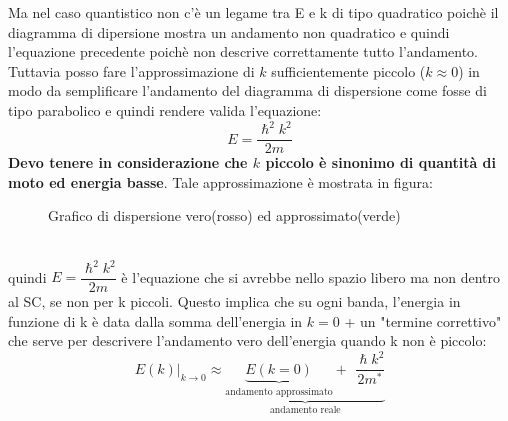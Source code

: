 Ma nel caso quantistico non c'è un legame tra E e k di tipo quadratico poichè il diagramma di dipersione mostra un andamento non quadratico e quindi l'equazione precedente poichè non descrive correttamente tutto l'andamento.\\
Tuttavia posso fare l'approssimazione di $k$ sufficientemente piccolo ($k \approx 0$) in modo da semplificare l'andamento del diagramma di dispersione come fosse di tipo parabolico e quindi rendere valida l'equazione:
\begin{equation}
    E=\dfrac{\hslash^2 k^2}{2m}
\end{equation}
\textbf{Devo tenere in considerazione che $k$ piccolo è sinonimo di quantità di moto ed energia basse}.
Tale approssimazione è mostrata in figura:
\begin{figure}[hbt!]
    \centering
    \caption{Grafico di dispersione vero(rosso) ed approssimato(verde)}
    \label{fig:Grafico di dispersione vero ed approssimato}
\end{figure}\\
%
quindi $E=\dfrac{\hslash^2 k^2}{2m}$ è l'equazione che si avrebbe nello spazio libero ma non dentro al SC, se non per k piccoli.
Questo implica che su ogni banda, l'energia in funzione di k è data dalla somma dell'energia in $k=0$ + un "termine correttivo" che serve per descrivere l'andamento vero dell'energia quando k non è piccolo:
\begin{equation}
    \left. E(k)\right |_{k\rightarrow 0} \approx  \underbrace{\underbrace{E(k=0)}_{\text{andamento approssimato}} + \, \, \dfrac{\hslash k^2}{2m^*}}_{\text{andamento reale}}
\end{equation}
